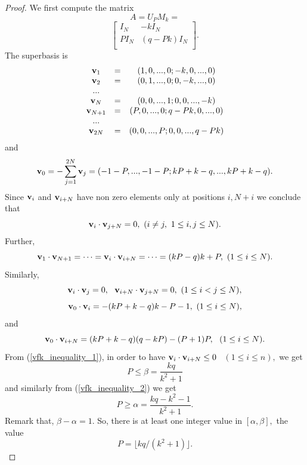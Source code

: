 \documentclass{amsart}
\numberwithin{equation}{section}
\begin{document}
{\begin{proof}
We first compute the matrix
$$A = U_PM_k=$$
\begin{equation}\label{vfk-matrix}
 \left[\begin{array}{c|c}
I_N & -kI_N  \\
\hline
PI_N & (q-Pk)I_N   \\
\end{array}\right].
\end{equation}
The superbasis is 
$$	
\begin{array}{ccc}
{\bf v}_1 & = &(1,0,...,0;-k,0,...,0)\\
{\bf v}_2 & =  & (0,1,...,0; 0,-k,...,0)\\
... \\
{\bf v}_N & = &(0,0,...,1;0,0,...,-k) \\
{\bf v}_{N+1} & = &(P,0,...,0;q-Pk,0,...,0) \\
...\\
{\bf v}_{2N} & = & (0,0,...,P;0,0,...,q-Pk)\\
\end{array}
$$ 
and
$${\bf v}_0 = -\sum_{j=1}^{2N} {\bf v}_j=(-1-P,...,-1-P;kP+k-q,...,kP+k-q).$$
Since ${\bf v}_i$ and ${\bf v}_{i+N}$ have non zero elements only at positions $i, N+i$ we conclude that
$${\bf v}_i\cdot {\bf v}_{j+N}=0,\ (i\not=j,\ 1\leq i,j\leq N).$$
Further,
\begin{equation}\label{vfk_inequality_1}
{\bf v}_1\cdot {\bf v}_{N+1} = \cdots={\bf v}_i\cdot {\bf v}_{i+N}=\cdots=(kP - q)k + P, \ (1\leq i \leq N).
\end{equation}			 
Similarly, 
$${\bf v}_i\cdot {\bf v}_j=0, \ \ {\bf v}_{i+N}\cdot {\bf v}_{j+N}=0,\ (1\leq i<j\leq N),$$
\begin{equation}\label{vfk_inequality_2}
{\bf v}_0\cdot {\bf v}_i =  -(kP + k - q)k - P - 1,\ (1\leq i\leq N),
\end{equation}			 
and
\begin{equation}\label{vfk_inequality_3}
{\bf v}_0\cdot {\bf v}_{i+N} =  (kP + k - q)(q-kP) - (P + 1)P,\ \ (1\leq i\leq N).
\end{equation}		
From (\ref{vfk_inequality_1}), in order to have ${\bf v}_i\cdot {\bf v}_{i+N}\leq 0$ \ $(1\le i\le n),$  we get 
$$P\le \beta=\frac{kq}{k^2+1}$$
and similarly from (\ref{vfk_inequality_2}) we get $$P\ge \alpha=\frac{kq-k^2-1}{k^2+1}.$$
Remark that,	
 $\beta - \alpha = 1.$ So, there is at least one   integer value in 
$[\alpha,\beta],$ the value 
\begin{equation}\label{value_of_P}
P=\lfloor kq/(k^2+1)\rfloor.
\end{equation}

\end{proof}}
\end{document}
